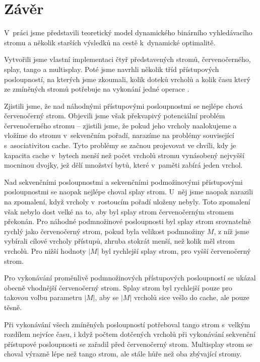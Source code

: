 \chapter*{Závěr}

V~práci jsme představili teoretický model dynamického binárního vyhledávacího stromu a několik starších výsledků na cestě k~dynamické optimalitě.

Vytvořili jsme vlastní implementaci čtyř představených stromů, červenočerného, splay, tango a multisplay. Poté jsme navrhli několik tříd přístupových posloupností, na kterých jsme zkoumali, kolik doteků vrcholů a kolik času který ze zmíněných stromů potřebuje na vykonání jedné operace . 

Zjistili jsme, že nad náhodnými přístupovými posloupnostmi se nejlépe chová
červenočerný strom. Objevili jsme však překvapivý potenciální problém
červenočerného stromu -- zjistili jsme, že pokud jeho vrcholy naalokujeme a
vložíme do stromu v~sekvenčním pořadí, narazíme na problémy související
s~asociativitou cache. Tyto problémy se začnou projevovat ve chvíli, kdy je kapacita cache v~bytech menší než počet vrcholů stromu
vynásobený nejvyšší mocninou dvojky, jež dělí množství bytů, které v~paměti
zabírá jeden vrchol.

Nad sekvenčními posloupnostmi a sekvenčními podmožinovými přístupovými posloupnostmi se
naopak nejlépe choval splay strom. U~něj jsme naopak narazili na zpomalení,
když vrcholy v~rostoucím pořadí uloženy nebyly. Toto zpomalení však nebylo dost
velké na to, aby byl splay strom červenočerným stromem překonán. Pro náhodné
podmnožinové posloupnosti byl splay strom srovnatelně rychlý jako červenočerný
strom, pokud byla velikost podmnožiny $M$, z níž jsme vybírali cílové vrcholy přístupů, zhruba stokrát menší, než kolik měl strom vrcholů. Pro nižší hodnoty $|M|$ byl rychlejší splay strom,
pro vyšší červenočerný strom. 

Pro vykonávání proměnlivě podmnožinových přístupových posloupností se ukázal
obecně vhodnější červenočerný strom. Splay strom byl rychlejší pouze pro takovou volbu
parametru $|M|$, aby se $|M|$ vrcholů sice vešlo do cache, ale pouze těsně.

Při vykonávání všech zmíněných posloupností potřeboval tango strom s~velkým
rozdílem nejvíce času, i když počtem dotčených vrcholů při vykonávání sekvenční
přístupové posloupnosti se zařadil před červenočerný strom. Multisplay strom se
choval výrazně lépe než tango strom, ale stále hůře než oba zbývající stromy.

